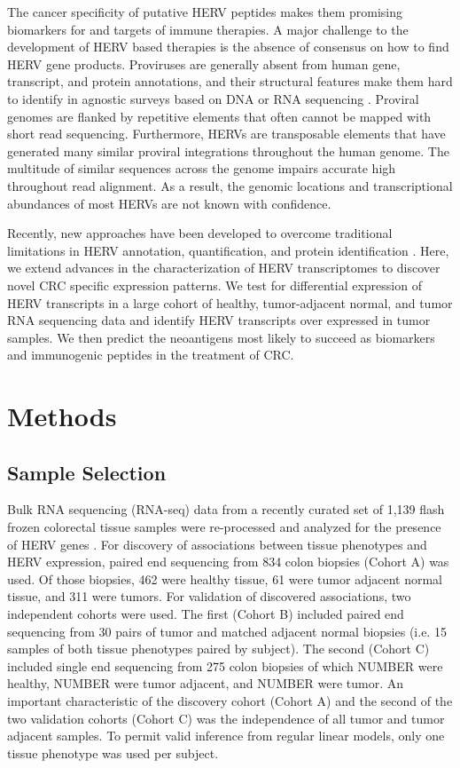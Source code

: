 \documentclass[10pt,letterpaper]{article}
\begin{document}
The cancer specificity of putative HERV peptides makes them promising biomarkers for and targets of immune therapies.
A major challenge to the development of HERV based therapies is the absence of consensus on how to find HERV gene products.
Proviruses are generally absent from human gene, transcript, and protein annotations, and their structural features make them hard to identify in agnostic surveys based on DNA or RNA sequencing \cite{ERVmap2018, Treangen2011}.
Proviral genomes are flanked by repetitive elements that often cannot be mapped with short read sequencing.
Furthermore, HERVs are transposable elements that have generated many similar proviral integrations throughout the human genome.
The multitude of similar sequences across the genome impairs accurate high throughout read alignment.
As a result, the genomic locations and transcriptional abundances of most HERVs are not known with confidence.

Recently, new approaches have been developed to overcome traditional limitations in HERV annotation, quantification, and protein identification \cite{Attig2017, Attig2019, ERVmap2018, Telescope2019}.
Here, we extend advances in the characterization of HERV transcriptomes to discover novel CRC specific expression patterns.
We test for differential expression of HERV transcripts in a large cohort of healthy, tumor-adjacent normal, and tumor RNA sequencing data and identify HERV transcripts over expressed in tumor samples.
We then predict the neoantigens most likely to succeed as biomarkers and immunogenic peptides in the treatment of CRC.

\section*{Methods}
\subsection*{Sample Selection}
Bulk RNA sequencing (RNA-seq) data from a recently curated set of 1,139 flash frozen colorectal tissue samples were re-processed and analyzed for the presence of HERV genes \cite{Dampier2020}.
For discovery of associations between tissue phenotypes and HERV expression, paired end sequencing from 834 colon biopsies (Cohort A) was used.
Of those biopsies, 462 were healthy tissue, 61 were tumor adjacent normal tissue, and 311 were tumors.
For validation of discovered associations, two independent cohorts were used.
The first (Cohort B) included paired end sequencing from 30 pairs of tumor and matched adjacent normal biopsies (i.e. 15 samples of both tissue phenotypes paired by subject).
The second (Cohort C) included single end sequencing from 275 colon biopsies of which NUMBER were healthy, NUMBER were tumor adjacent, and NUMBER were tumor.
An important characteristic of the discovery cohort (Cohort A) and the second of the two validation cohorts (Cohort C) was the independence of all tumor and tumor adjacent samples.
To permit valid inference from regular linear models, only one tissue phenotype was used per subject.
\end{document}
